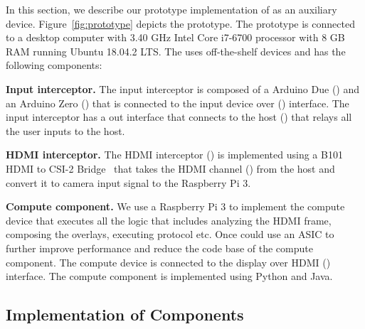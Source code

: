 In this section, we describe our prototype implementation of \name as an auxiliary device. Figure~\ref{fig:prototype} depicts the \name prototype. The prototype \device is connected to a desktop computer with 3.40 GHz Intel Core i7-6700 processor with 8 GB RAM running Ubuntu 18.04.2 LTS. The \device uses off-the-shelf devices and has the following components:

\begin{mylist}

  \item \textbf{Input interceptor.} The input interceptor is composed of a Arduino Due (\three) and an Arduino Zero (\four) that is connected to the input device over \usb (\two) interface. The input interceptor has a \usb out interface that connects to the host (\five) that relays all the user inputs to the host. 

  \item \textbf{HDMI interceptor.} The HDMI interceptor (\seven) is implemented using a B101 HDMI to CSI-2 Bridge~\cite{b101} that takes the HDMI channel (\eight) from the host and convert it to camera input signal to the Raspberry Pi 3.  
  
  \item \textbf{Compute component.}  We use a Raspberry Pi 3 to implement the compute device that executes all the \device logic that includes analyzing the HDMI frame, composing the overlays, executing \tls protocol etc. Once could use an ASIC to further improve performance and reduce the code base of the compute component. The compute device is connected to the display over HDMI (\nine) interface. The compute component is implemented using Python and Java.
\end{mylist}


\subsection{Implementation of \name Components}
\label{sec:prototype:impl}


